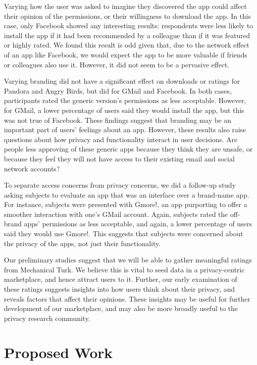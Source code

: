 \documentclass[11pt]{article}
\begin{document}
Varying how the user was asked to imagine they discovered the app
could affect their opinion of the permissions, or their willingness to
download the app. In this case, only Facebook showed any interesting
results: respondents were less likely to install the app if it
had been recommended by a colleague than if it was featured or highly
rated. We found this result is odd given that, due to the network
effect of an app like Facebook, we would expect the app to be more
valuable if friends or colleagues also use it. However, it did not
seem to be a pervasive effect.

Varying branding did not have a significant effect on downloads or
ratings for Pandora and Angry Birds, but did 
for GMail and Facebook. In both cases,
participants rated the generic version's permissions as less
acceptable. However, for GMail, a lower percentage of users said they
would install the app, but this was not true of Facebook.  These
findings suggest that branding may be an important part of users'
feelings about an app. However, these results also raise questions
about how privacy and functionality interact in user decisions. Are
people less approving of these generic apps because they think they
are unsafe, or because they feel they will not have access to their
existing email and social network accounts?

To separate access concerns from privacy concerns, we did a follow-up
study asking subjects to evaluate an app that was an
interface over a brand-name app. For instance,
subjects were presented with Gmore!, an app purporting to offer a
smoother interaction with one's GMail account. Again, subjects rated
the off-brand apps' permissions as less acceptable, and again, a lower
percentage of users said they would use Gmore!. This suggests that
subjects were concerned about the privacy of the apps, not just their
functionality.

Our preliminary studies suggest that we will be able to gather
meaningful ratings from Mechanical Turk. We believe this is vital
to seed data in a privacy-centric marketplace, and hence attract users
to it. Further, our early examination of these ratings 
suggests insights into how users think about their privacy, and reveals
factors that affect their opinions. These insights may be useful for
further development of our marketplace, and may also be more broadly
useful to the privacy research community.

\section{Proposed Work}
\end{document}
